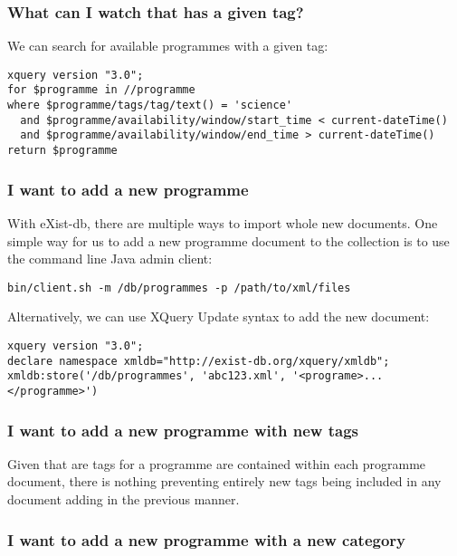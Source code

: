 \documentclass[11pt,a4paper]{article}
\begin{document}
\subsubsection{What can I watch that has a given tag?}

We can search for available programmes with a given tag:

\begin{lstlisting}
xquery version "3.0";
for $programme in //programme
where $programme/tags/tag/text() = 'science'
  and $programme/availability/window/start_time < current-dateTime()
  and $programme/availability/window/end_time > current-dateTime()
return $programme
\end{lstlisting}

\subsubsection{I want to add a new programme}

With eXist-db, there are multiple ways to import whole new documents. One
simple way for us to add a new programme document to the collection
is to use the command line Java admin client:

\begin{lstlisting}
bin/client.sh -m /db/programmes -p /path/to/xml/files
\end{lstlisting}

Alternatively, we can use XQuery Update syntax to add the new document:

\begin{lstlisting}
xquery version "3.0";
declare namespace xmldb="http://exist-db.org/xquery/xmldb";
xmldb:store('/db/programmes', 'abc123.xml', '<programe>...</programme>')
\end{lstlisting}

\subsubsection{I want to add a new programme with new tags}

Given that are tags for a programme are contained within each programme
document, there is nothing preventing entirely new tags being included
in any document adding in the previous manner.

\subsubsection{I want to add a new programme with a new category}
\end{document}
